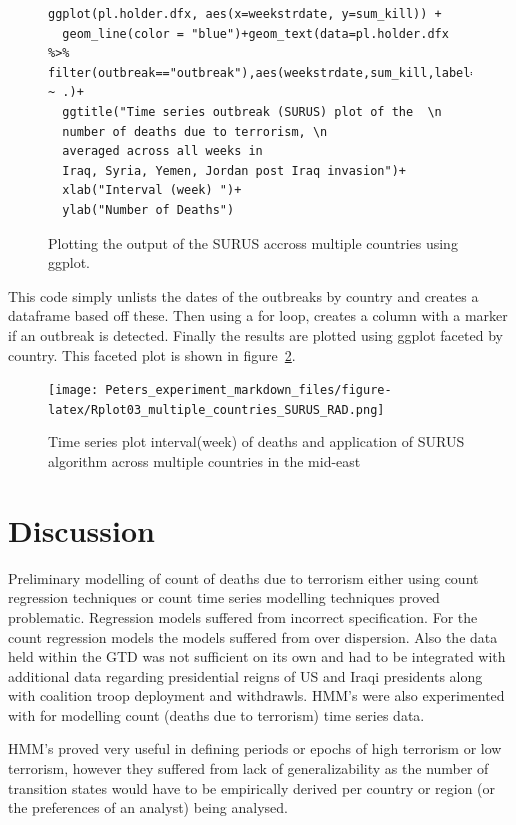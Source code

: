 \begin{figure}
\begin{verbatim}
ggplot(pl.holder.dfx, aes(x=weekstrdate, y=sum_kill)) +
  geom_line(color = "blue")+geom_text(data=pl.holder.dfx %>% filter(outbreak=="outbreak"),aes(weekstrdate,sum_kill,label="o"))+facet_grid(country_txt ~ .)+
  ggtitle("Time series outbreak (SURUS) plot of the  \n  
  number of deaths due to terrorism, \n 
  averaged across all weeks in 
  Iraq, Syria, Yemen, Jordan post Iraq invasion")+
  xlab("Interval (week) ")+
  ylab("Number of Deaths")
\end{verbatim}
\caption{Plotting the output of the SURUS accross multiple countries using ggplot.}
\label{fig:purrrlabel3}
\end{figure}


This code simply unlists the dates of the outbreaks by country and creates a dataframe based off these. Then using a for loop, creates a column with a marker if an outbreak is detected. Finally the results are plotted using ggplot faceted by country. This faceted plot is shown in figure~\ref{fig:tseriesSURUSmulcountry}. 

\begin{figure}[t]
\texttt{[image: Peters\_experiment\_markdown\_files/figure-latex/Rplot03\_multiple\_countries\_SURUS\_RAD.png]}
\label{fig:tseriesSURUSmulcountry}
\centering
\caption{Time series plot interval(week) of deaths and application of SURUS algorithm across multiple countries in the mid-east}
\end{figure}

\section{Discussion}
Preliminary modelling of count of deaths due to terrorism either using count regression techniques or count time series modelling techniques proved problematic. Regression models suffered from incorrect specification. For the count regression models the models suffered from over dispersion.  Also the data held within the GTD was not sufficient on its own and had to be integrated with additional data regarding presidential reigns of US and Iraqi presidents along with coalition troop deployment and withdrawls.  HMM’s were also experimented with for modelling count (deaths due to terrorism) time series data. 

HMM’s proved very useful in defining periods or epochs of high terrorism or low terrorism, however they suffered from lack of generalizability as the number of transition states would have to be empirically derived per country or region (or the preferences of an analyst) being analysed.  


